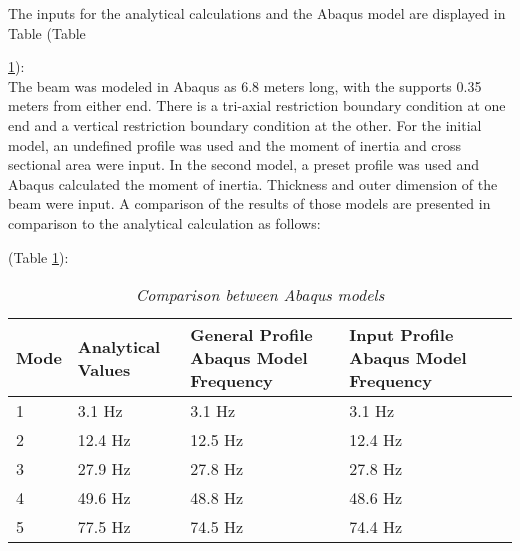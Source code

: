 \noindent The inputs for the analytical calculations and the Abaqus model are displayed in Table (Table 

\ref{tab:FEM_Abaqus_Comp}):\\

\indent The beam was modeled in Abaqus as 6.8 meters long, with the supports 0.35 meters from either end. There is a tri-axial restriction boundary
condition at one end and a vertical restriction boundary condition at the other. For the initial model, an undefined profile was used and the moment of
inertia and cross sectional area were input. In the second model, a preset profile was used and Abaqus calculated the moment of inertia. Thickness and
outer dimension of the beam were input. A comparison of the results of those models are presented in comparison to the analytical calculation as
follows:

(Table \ref{tab:FEM_Abaqus_Comp}):\\

\begin{table}[H]

\begin{center}

\begin{tabular}{|l| p{3.5cm}| p{3cm}| p{3cm}| p{3cm}|}

\hline

\textbf{Mode} & \textbf{Analytical Values} & \textbf{General Profile Abaqus Model Frequency}& 

\textbf{Input Profile Abaqus Model Frequency} \\\hline

1 & 3.1 Hz & 3.1 Hz & 3.1 Hz \\\hline

2 & 12.4 Hz & 12.5 Hz & 12.4 Hz \\\hline

3 & 27.9 Hz & 27.8 Hz & 27.8 Hz \\\hline

4 & 49.6 Hz & 48.8 Hz & 48.6 Hz \\\hline

5 & 77.5 Hz & 74.5 Hz & 74.4 Hz \\\hline

\end{tabular}

\caption{\textit{Comparison between Abaqus models}}

\label{tab:FEM_Abaqus_Comp}

\end{center}

\end{table}

